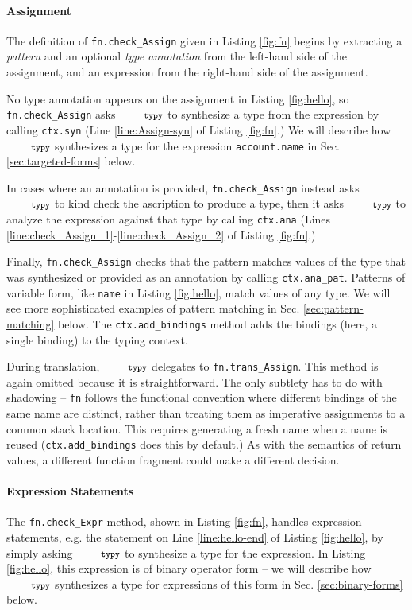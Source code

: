 \documentclass[10pt]{sigplanconf}
\newcommand{\typy}{\texttt{\footnotesize typy}}
\newcommand{\lip}[1]{\lstinline[language=Python,basicstyle=\ttfamily\footnotesize,morekeywords={with},deletendkeywords={tuple,buffer,map}]{#1}}
\newcommand{\li}[1]{\lip{#1}}
\begin{document}
\paragraph{Assignment}
The definition of \li{fn.check_Assign} given in Listing \ref{fig:fn} begins by extracting a \emph{pattern} and an optional \emph{type annotation} from the left-hand side of the assignment, and an expression from the right-hand side of the assignment. 


No type annotation appears on the assignment in Listing \ref{fig:hello}, so \li{fn.check_Assign} asks $\typy$ to synthesize a type from the expression by calling \li{ctx.syn} (Line \ref{line:Assign-syn} of Listing \ref{fig:fn}.) We will describe how $\typy$ synthesizes a type for the expression \li{account.name} in Sec. \ref{sec:targeted-forms} below.

In cases where an annotation is provided, \li{fn.check_Assign} instead  asks $\typy$ to kind check the ascription to produce a type, then it asks $\typy$ to analyze the expression against that type by calling \li{ctx.ana} (Lines \ref{line:check_Assign_1}-\ref{line:check_Assign_2} of Listing \ref{fig:fn}.)

Finally, \li{fn.check_Assign} checks that the pattern matches values of the type that was synthesized or provided as an annotation by calling \li{ctx.ana_pat}. Patterns of variable form, like \li{name} in Listing \ref{fig:hello}, match values of any type. We will see more sophisticated examples of pattern matching in Sec. \ref{sec:pattern-matching} below. The \li{ctx.add_bindings} method adds the bindings (here, a single binding) to the typing context.

During translation, $\typy$ delegates to \li{fn.trans_Assign}. This method is again omitted because it is straightforward. The only subtlety has to do with shadowing -- \li{fn} follows the functional  convention where different bindings of the same name are distinct, rather than treating them as imperative assignments to a common stack location. This requires generating a fresh name when a name is reused (\li{ctx.add_bindings} does this by default.) As with the semantics of return values, a different function fragment could make a different decision.

\paragraph{Expression Statements} The \li{fn.check_Expr} method, shown in Listing \ref{fig:fn}, handles expression statements, e.g. the statement on Line \ref{line:hello-end} of Listing \ref{fig:hello}, by simply asking $\typy$ to synthesize a type for the expression. In Listing \ref{fig:hello}, this expression is of binary operator form -- we will describe how $\typy$ synthesizes a type for expressions of this form in Sec. \ref{sec:binary-forms} below.
\end{document}
